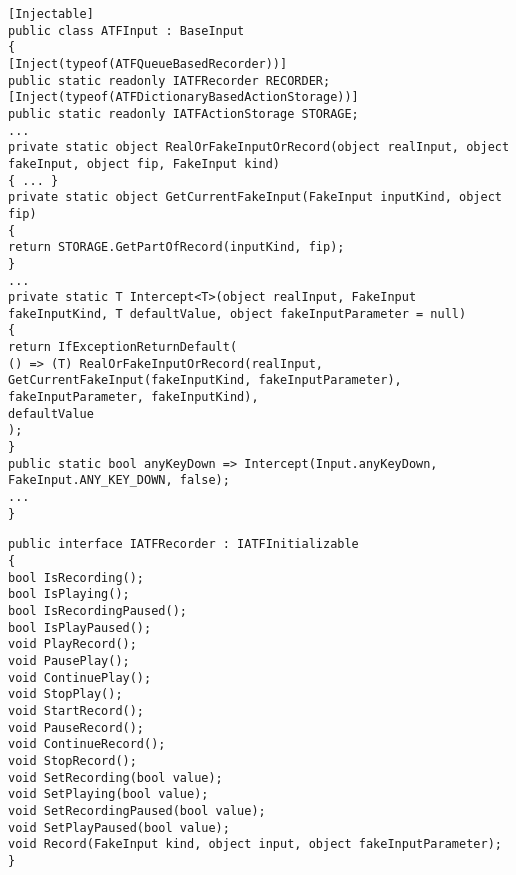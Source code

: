 \begin{lstlisting}[caption={Бизнес-логика системы симуляции и перехвата ввода},label=input]
[Injectable]
public class ATFInput : BaseInput
{
[Inject(typeof(ATFQueueBasedRecorder))]
public static readonly IATFRecorder RECORDER;
[Inject(typeof(ATFDictionaryBasedActionStorage))]
public static readonly IATFActionStorage STORAGE;
...
private static object RealOrFakeInputOrRecord(object realInput, object fakeInput, object fip, FakeInput kind)
{ ... }
private static object GetCurrentFakeInput(FakeInput inputKind, object fip)
{
return STORAGE.GetPartOfRecord(inputKind, fip);
}
...
private static T Intercept<T>(object realInput, FakeInput fakeInputKind, T defaultValue, object fakeInputParameter = null)
{
return IfExceptionReturnDefault(
() => (T) RealOrFakeInputOrRecord(realInput, GetCurrentFakeInput(fakeInputKind, fakeInputParameter), fakeInputParameter, fakeInputKind), 
defaultValue
);
}
public static bool anyKeyDown => Intercept(Input.anyKeyDown, FakeInput.ANY_KEY_DOWN, false);
...
}
\end{lstlisting}

\begin{lstlisting}[caption={Интерфейc модуля записи},label=iRecorder]
public interface IATFRecorder : IATFInitializable
{
bool IsRecording();
bool IsPlaying();
bool IsRecordingPaused();
bool IsPlayPaused();
void PlayRecord();
void PausePlay();
void ContinuePlay();
void StopPlay();
void StartRecord();
void PauseRecord();
void ContinueRecord();
void StopRecord();
void SetRecording(bool value);
void SetPlaying(bool value);
void SetRecordingPaused(bool value);
void SetPlayPaused(bool value);
void Record(FakeInput kind, object input, object fakeInputParameter);
}
\end{lstlisting}